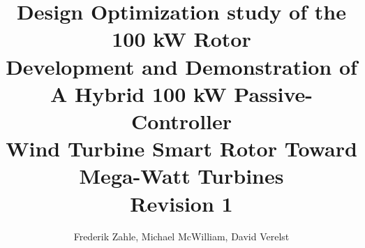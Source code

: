 \documentclass[
oneside,
paper=a4,
fontsize=9pt,
parskip=half,        %
DIV=12,              %
BCOR=10mm,           %
headings=normal,
appendixprefix=true, %
]{scrbook}			%
\begin{document}
\title{Design Optimization study of the 100 kW Rotor\\
\vspace{0.5cm}
Development and Demonstration of A Hybrid 100 kW Passive-Controller\\
Wind Turbine Smart Rotor Toward Mega-Watt Turbines\\
Revision 1}
\vspace{0.5cm}
\author{Frederik Zahle, Michael McWilliam, David Verelst}

\maketitle


\tableofcontents



\clearpage

%
\clearpage

%



\end{document}
